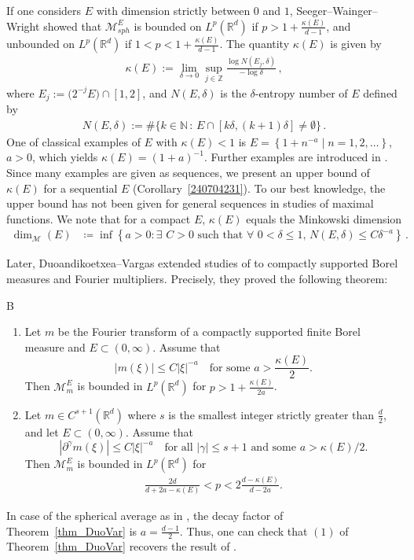 \documentclass[11pt]{amsart}
\theoremstyle{plain}
\theoremstyle{definition}
\theoremstyle{remark}
\numberwithin{equation}{section}
\newcommand{\bR}{\mathbb{R}}
\newcommand{\bZ}{\mathbb{Z}}
\newcommand{\bN}{\mathbb{N}}
\begin{document}
If one considers $E$ with dimension strictly between $0$ and $1$, Seeger--Wainger--Wright \cite{SWW1995} showed that $\mathcal{M}_{sph}^E$ is bounded on $L^p(\bR^d)$ if $p>1+\frac{\kappa(E)}{d-1}$, and unbounded on $L^p(\bR^d)$ if $1<p<1+\frac{\kappa(E)}{d-1}$.
The quantity $\kappa(E)$ is given by
\begin{align*}%
\kappa(E):=\lim_{\delta\rightarrow 0}\sup_{j\in\bZ}\frac{\log N(E_j,\delta)}{-\log \delta}\,,
\end{align*}
where $E_j:=\big(2^{-j}E\big)\cap [1,2]$, and $N(E, \delta)$ is the $\delta$-entropy number of $E$ defined by
\begin{align*}%
    N(E,\delta):=\#\big\{k\in\bN\,:\,E\cap [k\delta,(k+1)\delta]\neq \emptyset\big\}\,.
\end{align*}
One of classical examples of $E$ with $\kappa(E)<1$ is $E=\left\{1+n^{-a}\mid n=1,2,\dots\right\}$, $a>0$, which yields $\kappa(E) = (1+a)^{-1}$.
Further examples are introduced in \cite{RoSe2023}.
Since many examples are given as sequences, we present an upper bound of $\kappa(E)$ for a sequential $E$ (Corollary~\ref{240704231}).
To our best knowledge, the upper bound has not been given for general sequences in studies of maximal functions.
We note that for a compact $E$, $\kappa(E)$ equals the Minkowski dimension
\begin{align*}
    \dim_{\mathcal{M}}(E)
    &\coloneqq\inf\left\{a>0:\text{$\exists\,\,C>0$ such that $\forall\,\,0<\delta\leq 1$, $N(E,\delta)\leq C\delta^{-a}$}\right\}\,.
\end{align*}


Later, Duoandikoetxea--Vargas \cite{DuoVar1998} extended studies of \cite{SWW1995} to compactly supported Borel measures and Fourier multipliers.
Precisely, they proved the following theorem:
\begin{customthm}{B}\label{thm_DuoVar}\,

    \begin{enumerate}
    \item 
    Let $m$ be the Fourier transform of a compactly supported finite Borel measure and $E\subset(0,\infty)$.
    Assume that 
    $$
        |m(\xi)|\leq C|\xi|^{-a}\quad\text{for some $a>\frac{\kappa(E)}{2}$}.
    $$
    Then $\mathcal{M}_m^E$ is bounded in $L^p(\bR^d)$ for $p>1+\frac{\kappa(E)}{2a}$.
    \item
    Let $m\in C^{s+1}(\bR^d)$ where $s$ is the smallest integer strictly greater than $\frac{d}{2}$, and let $E\subset(0,\infty)$.
    Assume that 
    $$
        \left|\partial^\gamma m(\xi)\right| \leq C|\xi|^{-a}\quad\text{for all $|\gamma|\leq s+1$ and some $a>\kappa(E)/2$}.
    $$
    Then $\mathcal{M}_m^E$ is bounded in $L^p(\bR^d)$ for
    \begin{align}\label{240516302}
        \frac{2d}{d+2a-\kappa(E)}<p<2\frac{d-\kappa(E)}{d-2a}.
    \end{align}
    \end{enumerate}
\end{customthm}
\noindent In case of the spherical average as in \cite{SWW1995}, the decay factor of Theorem~\ref{thm_DuoVar} is $a=\frac{d-1}{2}$.
Thus, one can check that $(1)$ of Theorem~\ref{thm_DuoVar} recovers the result of \cite{SWW1995}.
\end{document}
